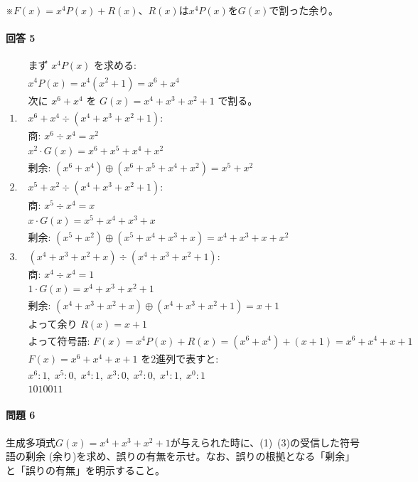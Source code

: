 \documentclass[dvipdfmx,titlepage,a4j]{jsarticle}
\begin{document}
※$F(x)=x^4P(x)+R(x)$、$R(x)$は$x^4P(x)$を$G(x)$で割った余り。

\paragraph{ 回答 5\\}
\[
\begin{aligned}
&\text{まず } x^4P(x)\text{ を求める:}\\
&x^4P(x)=x^4(x^2+1)=x^6+x^4 \\[6pt]
&\text{次に } x^6+x^4 \text{ を } G(x)=x^4+x^3+x^2+1 \text{ で割る。}\\[6pt]
1.\; &x^6+x^4 \div (x^4+x^3+x^2+1):
   \\
   &\text{商: }x^6 ÷ x^4 = x^2 \\
   &x^2 \cdot G(x) = x^6+x^5+x^4+x^2 \\[6pt]
   &\text{剰余: }(x^6+x^4) \oplus (x^6+x^5+x^4+x^2) = x^5+x^2 \\[6pt]
2.\; &x^5+x^2 \div (x^4+x^3+x^2+1):
   \\
   &\text{商: }x^5 ÷ x^4 = x \\
   &x \cdot G(x) = x^5+x^4+x^3+x \\[6pt]
   &\text{剰余: }(x^5+x^2) \oplus (x^5+x^4+x^3+x) = x^4+x^3+x+x^2 \\[6pt]
3.\; &(x^4+x^3+x^2+x) \div (x^4+x^3+x^2+1):
   \\
   &\text{商: } x^4 ÷ x^4 = 1 \\
   &1 \cdot G(x) = x^4+x^3+x^2+1 \\[6pt]
   &\text{剰余: }(x^4+x^3+x^2+x) \oplus (x^4+x^3+x^2+1) = x+1 \\[6pt]
&\text{よって余り }R(x)=x+1 \\[6pt]
&\text{よって符号語: } F(x)=x^4P(x)+R(x)= (x^6+x^4)+(x+1)=x^6+x^4+x+1 \\[6pt]
&F(x)=x^6+x^4+x+1 \text{ を2進列で表すと:}\\
&x^6:1,\; x^5:0,\; x^4:1,\; x^3:0,\; x^2:0,\; x^1:1,\; x^0:1 \\
&\boxed{1010011}
\end{aligned}
\]

\paragraph{ 問題 6\\}
生成多項式$G(x)=x^4+x^3+x^2+1$が与えられた時に、(1)~(3)の受信した符号語の剰余
(余り)を求め、誤りの有無を示せ。なお、誤りの根拠となる「剰余」と「誤りの有無」を明示すること。
\end{document}
